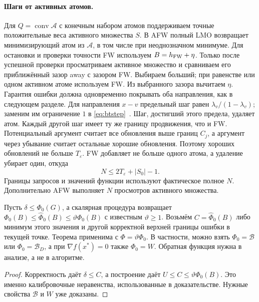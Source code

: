 \paragraph{Шаги от активных атомов.}\label{alg:afw}
Для $Q=\operatorname{conv}\mathcal A$ с конечным набором атомов
поддерживаем точные положительные веса активного множества $S$.
В AFW полный LMO возвращает минимизирующий атом из $\mathcal A$,
в том числе при неоднозначном минимуме.
Для остановки и проверки точности FW используем $B=h_{\rm FW}+\eta$.
Только после успешной проверки просматриваем активное множество
и сравниваем его приближённый зазор away с зазором FW.
Выбираем больший; при равенстве или одном активном атоме используем FW.
Из выбранного зазора вычитаем $\eta$.
Гарантия ошибки должна одновременно покрывать оба направления,
как в следующем разделе.
Для направления $x-v$ предельный шаг равен $\lambda_v/(1-\lambda_v)$;
заменим им ограничение $1$ в \eqref{eq:btstep}~\cite{lacostejaggi}.
Шаг, достигший этого предела, удаляет атом.
Каждый другой шаг имеет ту же границу продвижения, что и FW.
Потенциальный аргумент считает все обновления выше границ $C_j$,
а аргумент через убывание считает остальные хорошие обновления.
Поэтому хороших обновлений не больше $T_\varepsilon$.
FW добавляет не больше одного атома, а удаление убирает один, откуда
\begin{equation}\label{eq:dropcount}
 N\le2T_\varepsilon+|S_0|-1.
\end{equation}
Границы запросов и значений функции используют фактическое полное $N$.
Дополнительно AFW выполняет $N$ просмотров активного множества.

\begin{corollary}
\label{nloracle:energy}
Пусть $\delta\le\Phi_0(G)$, а скалярная процедура возвращает
$\Phi_0(B)\le\widehat\Phi_0(B)\le\vartheta\Phi_0(B)$
с известным $\vartheta\ge1$.
Возьмём $C=\widehat\Phi_0(B)$ либо минимум этого значения и
другой корректной верхней границы ошибки в текущей точке.
Теорема применима с $\Phi=\vartheta\Phi_0$.
В частности, можно взять $\Phi_0=\mathcal B$ или $\Phi_0=\mathcal B_D$, а при
$\nabla f(x^*)=0$ также $\Phi_0=W$.
Обратная функция нужна в анализе, а не в алгоритме.
\end{corollary}
\begin{proof}
Корректность даёт $\delta\le C$, а построение даёт
$U\le C\le\vartheta\Phi_0(B)$.
Это именно калибровочные неравенства, использованные в доказательстве.
Нужные свойства $\mathcal B$ и $W$ уже доказаны.
\end{proof}

